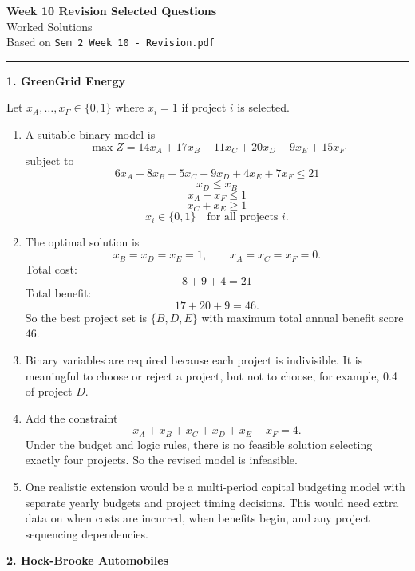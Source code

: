 \documentclass[11pt,a4paper]{article}
\begin{document}
\begin{center}
{\Large\bfseries\color{packblue} Week 10 Revision Selected Questions}\\[0.4em]
{\large Worked Solutions}\\[0.3em]
{\color{packgrey} Based on \texttt{Sem 2 Week 10 - Revision.pdf}}
\end{center}

\vspace{0.8em}
\hrule
\vspace{1em}

\textbf{1. GreenGrid Energy}

Let $x_A,\ldots,x_F \in \{0,1\}$ where $x_i=1$ if project $i$ is selected.

\begin{enumerate}
\item A suitable binary model is
\[
\max Z = 14x_A+17x_B+11x_C+20x_D+9x_E+15x_F
\]
subject to
\[
6x_A+8x_B+5x_C+9x_D+4x_E+7x_F \le 21
\]
\[
x_D \le x_B
\]
\[
x_A+x_F \le 1
\]
\[
x_C+x_E \ge 1
\]
\[
x_i \in \{0,1\} \quad \text{for all projects } i.
\]

\item The optimal solution is
\[
x_B=x_D=x_E=1,\qquad x_A=x_C=x_F=0.
\]
Total cost:
\[
8+9+4=21
\]
Total benefit:
\[
17+20+9=46.
\]
So the best project set is $\{B,D,E\}$ with maximum total annual benefit score $46$.

\item Binary variables are required because each project is indivisible.
It is meaningful to choose or reject a project, but not to choose, for example, 0.4 of project $D$.

\item Add the constraint
\[
x_A+x_B+x_C+x_D+x_E+x_F=4.
\]
Under the budget and logic rules, there is no feasible solution selecting exactly four projects.
So the revised model is infeasible.

\item One realistic extension would be a multi-period capital budgeting model with separate yearly budgets and project timing decisions.
This would need extra data on when costs are incurred, when benefits begin, and any project sequencing dependencies.
\end{enumerate}

\newpage

\textbf{2. Hock-Brooke Automobiles}

\end{document}
